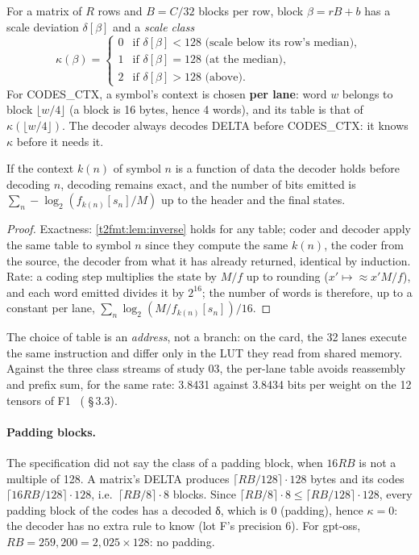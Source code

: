 For a matrix of $R$ rows and $B = C/32$ blocks per row, block $\beta = rB + b$ has a scale deviation $\delta[\beta]$ and a \emph{scale class}
\[
\kappa(\beta) = \begin{cases} 0 & \text{if } \delta[\beta] < 128 \text{ (scale below its row's median)},\\ 1 & \text{if } \delta[\beta] = 128 \text{ (at the median)},\\ 2 & \text{if } \delta[\beta] > 128 \text{ (above)}. \end{cases}
\]
For CODES\_CTX, a symbol's context is chosen \textbf{per lane}: word $w$ belongs to block $\lfloor w/4 \rfloor$ (a block is 16 bytes, hence 4 words), and its table is that of $\kappa(\lfloor w/4 \rfloor)$. The decoder always decodes DELTA before CODES\_CTX: it knows $\kappa$ before it needs it.

\begin{proposition}\label{t2fmt:prop:contexte}
If the context $k(n)$ of symbol $n$ is a function of data the decoder holds before decoding $n$, decoding remains exact, and the number of bits emitted is $\sum_n -\log_2(f_{k(n)}[s_n]/M)$ up to the header and the final states.
\end{proposition}
\begin{proof}
Exactness: \cref{t2fmt:lem:inverse} holds for any table; coder and decoder apply the same table to symbol $n$ since they compute the same $k(n)$, the coder from the source, the decoder from what it has already returned, identical by induction. Rate: a coding step multiplies the state by $M/f$ up to rounding ($x' \mapsto \approx x' M/f$), and each word emitted divides it by $2^{16}$; the number of words is therefore, up to a constant per lane, $\sum_n \log_2(M/f_{k(n)}[s_n]) / 16$.
\end{proof}

The choice of table is an \emph{address}, not a branch: on the card, the 32 lanes execute the same instruction and differ only in the LUT they read from shared memory. Against the three class streams of study 03, the per-lane table avoids reassembly and prefix sum, for the same rate: 3.8431 against 3.8434 bits per weight on the 12 tensors of F1 \mes~( §\,3.3).

\paragraph{Padding blocks.} The specification did not say the class of a padding block, when $16RB$ is not a multiple of 128. A matrix's DELTA produces $\lceil RB/128 \rceil \cdot 128$ bytes and its codes $\lceil 16RB/128 \rceil \cdot 128$, i.e.\ $\lceil RB/8 \rceil \cdot 8$ blocks. Since $\lceil RB/8 \rceil \cdot 8 \le \lceil RB/128 \rceil \cdot 128$, every padding block of the codes has a decoded δ, which is 0 (padding), hence $\kappa = 0$: the decoder has no extra rule to know (lot F's precision 6). For gpt-oss, $RB = 259{,}200 = 2{,}025 \times 128$: no padding.


